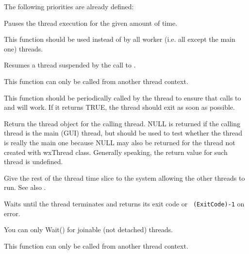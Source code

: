 The following priorities are already defined:

\twocolwidtha{7cm}
\begin{twocollist}\itemsep=0pt
\end{twocollist}

\label{wxthreadsleep}


Pauses the thread execution for the given amount of time.

This function should be used instead of  by all worker
(i.e. all except the main one) threads.

\label{wxthreadresume}


Resumes a thread suspended by the call to .

This function can only be called from another thread context.

\label{wxthreadtestdestroy}


This function should be periodically called by the thread to ensure that calls
to  and  will
work. If it returns TRUE, the thread should exit as soon as possible.

\label{wxthreadthis}


Return the thread object for the calling thread. NULL is returned if the calling thread
is the main (GUI) thread, but  should be used to test
whether the thread is really the main one because NULL may also be returned for the thread
not created with wxThread class. Generally speaking, the return value for such thread
is undefined.

\label{wxthreadyield}


Give the rest of the thread time slice to the system allowing the other threads to run.
See also .

\label{wxthreadwait}


Waits until the thread terminates and returns its exit code or {\tt
(ExitCode)-1} on error.

You can only Wait() for joinable (not detached) threads.

This function can only be called from another thread context.
